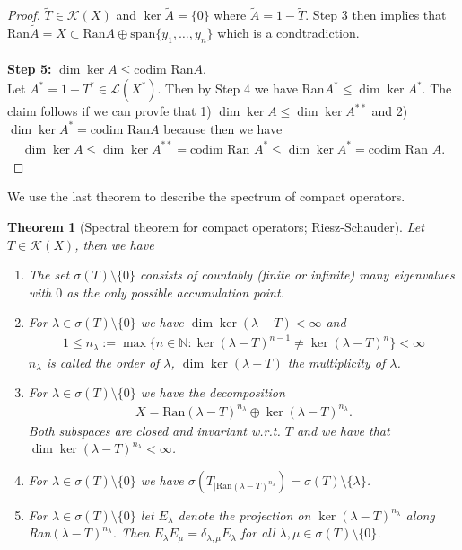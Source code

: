 \documentclass[11pt,a4paper]{article}
\newtheorem{thm}{Theorem}[section]
\theoremstyle{definition}
\begin{document}
\begin{proof}
$\tilde{T} \in \mathcal{K}(X)$ and $\ker \tilde{A}= \lbrace 0 \rbrace$ where $\tilde{A}= 1- \tilde{T}$. Step 3 then implies that Ran$\tilde{A}=X \subset \text{Ran}A \oplus \text{span} \{ y_1, \dots , y_n\}$ which is a condtradiction. \\
\\
\textbf{Step 5:} $\dim \ker A \leq \text{codim}$ Ran$A$.\\
Let $A^*=1-T^* \in \mathcal{L}(X^*)$. Then by Step 4 we have Ran$A^* \leq \dim \ker A^*$. The claim follows if we can provfe that 1) $\dim \ker A \leq \dim \ker A^{**}$ and 2) $\dim \ker A^* = \text{codim Ran} A$ because then we have
\begin{align*}
\dim \ker A \leq \dim \ker A^{**} = \text{codim Ran } A^* \leq \dim \ker A^* = \text{codim Ran } A.
\end{align*} 
\end{proof}
\newpage
We use the last theorem to describe the spectrum of compact operators. 
\begin{thm}[Spectral theorem for compact operators; Riesz-Schauder] Let $T \in \mathcal{K}(X)$, then we have
\begin{enumerate}
\item The set $\sigma(T) \setminus \lbrace 0 \rbrace$ consists of countably (finite or infinite) many eigenvalues with $0$ as the only possible accumulation point.
\item For $\lambda \in \sigma(T) \setminus \lbrace 0 \rbrace$ we have $\dim \ker ( \lambda -T) < \infty$ and 
\begin{align*}
1 \leq n_\lambda := \max \lbrace n \in \mathbb{N}: \ker( \lambda-T)^{n-1} \neq \ker ( \lambda -T)^n \rbrace < \infty
\end{align*}
$n_\lambda$ is called the order of $\lambda$, $\dim \ker ( \lambda-T)$ the multiplicity of $\lambda$.
\item For $\lambda \in \sigma(T) \setminus \lbrace 0 \rbrace$ we have the decomposition
\begin{align*}
X= \text{Ran}( \lambda-T)^{n_\lambda} \oplus \ker ( \lambda-T)^{n_\lambda}.
\end{align*}
Both subspaces are closed and invariant w.r.t. $T$ and we have that $\dim \ker ( \lambda-T)^{n_\lambda} < \infty$.
\item For $\lambda \in \sigma(T) \setminus \{0 \}$ we have $\sigma(T_{ \mid \text{Ran}(\lambda-T)^{n_\lambda}}) = \sigma(T) \setminus \lbrace \lambda \rbrace$. 
\item For $\lambda \in \sigma(T) \setminus \{0\}$ let $E_\lambda$ denote the projection on $\ker( \lambda-T)^{n_\lambda} $ along Ran$(\lambda-T)^{n_\lambda}$. Then $E_\lambda E_\mu = \delta_{\lambda, \mu} E_\lambda$ for all $\lambda, \mu \in \sigma(T) \setminus \{0 \}$. 
\end{enumerate}
\end{thm}
\end{document}
